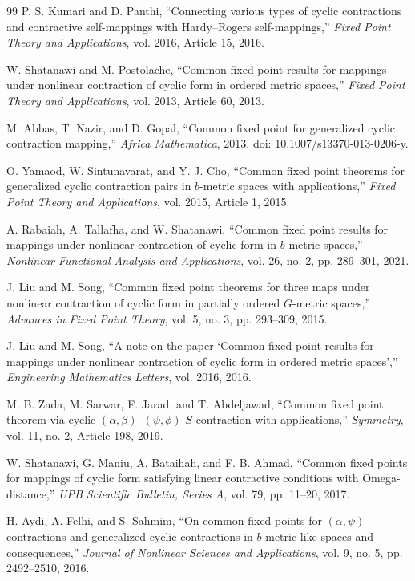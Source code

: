 \documentclass[11pt,a4paper,margin=1in]{amsart}
\theoremstyle{plain}
\theoremstyle{definition}
\theoremstyle{remark}
\begin{document}
\begin{thebibliography}{99}
P. S. Kumari and D. Panthi,
``Connecting various types of cyclic contractions and contractive self-mappings
with Hardy--Rogers self-mappings,''
\emph{Fixed Point Theory and Applications}, vol. 2016,
Article 15, 2016.

W. Shatanawi and M. Postolache,
``Common fixed point results for mappings under nonlinear contraction of cyclic
form in ordered metric spaces,''
\emph{Fixed Point Theory and Applications}, vol. 2013,
Article 60, 2013.

M. Abbas, T. Nazir, and D. Gopal,
``Common fixed point for generalized cyclic contraction mapping,''
\emph{Africa Mathematica}, 2013.
doi: 10.1007/s13370-013-0206-y.

O. Yamaod, W. Sintunavarat, and Y. J. Cho,
``Common fixed point theorems for generalized cyclic contraction pairs
in $b$-metric spaces with applications,''
\emph{Fixed Point Theory and Applications}, vol. 2015,
Article 1, 2015.

A. Rabaiah, A. Tallafha, and W. Shatanawi,
``Common fixed point results for mappings under nonlinear contraction of cyclic
form in $b$-metric spaces,''
\emph{Nonlinear Functional Analysis and Applications}, vol. 26, no. 2,
pp. 289--301, 2021.

J. Liu and M. Song,
``Common fixed point theorems for three maps under nonlinear contraction of
cyclic form in partially ordered $G$-metric spaces,''
\emph{Advances in Fixed Point Theory}, vol. 5, no. 3,
pp. 293--309, 2015.

J. Liu and M. Song,
``A note on the paper `Common fixed point results for mappings under nonlinear
contraction of cyclic form in ordered metric spaces',''
\emph{Engineering Mathematics Letters}, vol. 2016, 2016.

M. B. Zada, M. Sarwar, F. Jarad, and T. Abdeljawad,
``Common fixed point theorem via cyclic
$(\alpha,\beta)$--$(\psi,\phi)$ $S$-contraction with applications,''
\emph{Symmetry}, vol. 11, no. 2, Article 198, 2019.

W. Shatanawi, G. Maniu, A. Bataihah, and F. B. Ahmad,
``Common fixed points for mappings of cyclic form satisfying linear contractive
conditions with Omega-distance,''
\emph{UPB Scientific Bulletin, Series A}, vol. 79,
pp. 11--20, 2017.

H. Aydi, A. Felhi, and S. Sahmim,
``On common fixed points for $(\alpha,\psi)$-contractions and generalized
cyclic contractions in $b$-metric-like spaces and consequences,''
\emph{Journal of Nonlinear Sciences and Applications}, vol. 9, no. 5,
pp. 2492--2510, 2016.


\end{thebibliography}
\end{document}

